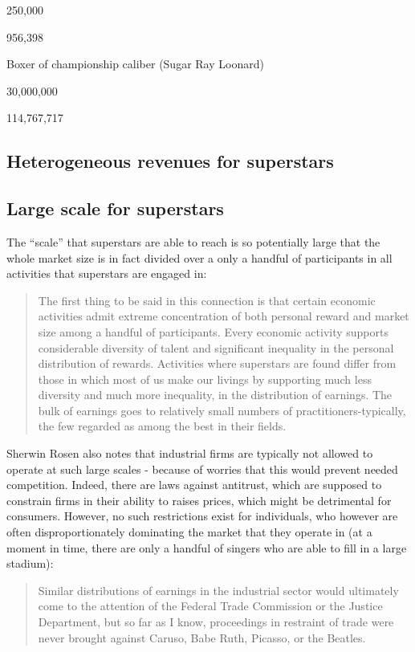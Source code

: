 \documentclass[]{book}
\theoremstyle{definition}
\theoremstyle{definition}
\theoremstyle{definition}
\theoremstyle{remark}
\begin{document}
250,000

956,398

Boxer of championship caliber (Sugar Ray Loonard)

30,000,000

114,767,717

\hypertarget{inequality}{\subsection{Heterogeneous revenues for
superstars}\label{inequality}}

\hypertarget{scale}{\subsection{Large scale for
superstars}\label{scale}}

The ``scale'' that superstars are able to reach is so potentially large
that the whole market size is in fact divided over a only a handful of
participants in all activities that superstars are engaged in:

\begin{quote}
The first thing to be said in this connection is that certain economic
activities admit extreme concentration of both personal reward and
market size among a handful of participants. Every economic activity
supports considerable diversity of talent and significant inequality in
the personal distribution of rewards. Activities where superstars are
found differ from those in which most of us make our livings by
supporting much less diversity and much more inequality, in the
distribution of earnings. The bulk of earnings goes to relatively small
numbers of practitioners-typically, the few regarded as among the best
in their fields.
\end{quote}

Sherwin Rosen also notes that industrial firms are typically not allowed
to operate at such large scales - because of worries that this would
prevent needed competition. Indeed, there are laws against antitrust,
which are supposed to constrain firms in their ability to raises prices,
which might be detrimental for consumers. However, no such restrictions
exist for individuals, who however are often disproportionately
dominating the market that they operate in (at a moment in time, there
are only a handful of singers who are able to fill in a large stadium):

\begin{quote}
Similar distributions of earnings in the industrial sector would
ultimately come to the attention of the Federal Trade Commission or the
Justice Department, but so far as I know, proceedings in restraint of
trade were never brought against Caruso, Babe Ruth, Picasso, or the
Beatles.
\end{quote}
\end{document}
